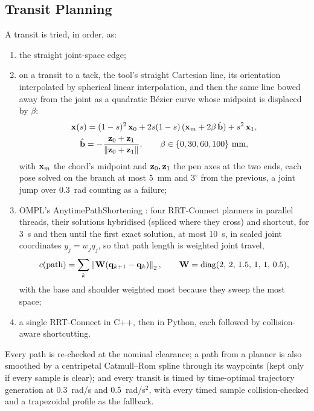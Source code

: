 \subsection{Transit Planning}
\label{sec:mc_transit}
A transit is tried, in order, as:
\begin{enumerate}
\item the straight joint-space edge;
\item on a transit to a tack, the tool's straight Cartesian line, its orientation interpolated by
  spherical linear interpolation, and then the same line bowed away from the joint as a quadratic
  B\'ezier curve whose midpoint is displaced by $\beta$:
  \begin{equation}
  \begin{gathered}
  \mathbf{x}(s) = (1-s)^2\,\mathbf{x}_0 + 2s(1-s)\,(\mathbf{x}_m + 2\beta\,\hat{\mathbf{b}}) + s^2\,\mathbf{x}_1,\\
  \hat{\mathbf{b}}=-\frac{\mathbf{z}_0+\mathbf{z}_1}{\left\lVert\mathbf{z}_0+\mathbf{z}_1\right\rVert},\qquad
  \beta\in\{0, 30, 60, 100\}\ \mathrm{mm},
  \end{gathered}
  \label{eq:cartesian_bow}
  \end{equation}
  with $\mathbf{x}_m$ the chord's midpoint and $\mathbf{z}_0,\mathbf{z}_1$ the pen axes at the two ends, each
  pose solved on the branch at most 5~mm and $3^\circ$ from the previous, a joint jump over 0.3~rad
  counting as a failure;
\item OMPL's AnytimePathShortening \cite{luna2013aps,sucan2012ompl}: four RRT-Connect planners
  \cite{kuffner2000rrtconnect} in parallel threads, their solutions hybridised (spliced where they
  cross) and shortcut, for 3~s and then until the first exact solution, at most 10~s, in scaled joint
  coordinates $y_j=w_jq_j$, so that path length is weighted joint travel,
  \begin{equation}
  c(\text{path}) = \sum_{k}\left\lVert\mathbf{W}(\mathbf{q}_{k+1}-\mathbf{q}_k)\right\rVert_2,\qquad
  \mathbf{W}=\operatorname{diag}(2,\,2,\,1.5,\,1,\,1,\,0.5),
  \label{eq:transit_cost}
  \end{equation}
  with the base and shoulder weighted most because they sweep the most space;
\item a single RRT-Connect in C++, then in Python, each followed by collision-aware shortcutting.
\end{enumerate}
Every path is re-checked at the nominal clearance; a path from a planner is also smoothed by a
centripetal Catmull--Rom spline through its waypoints (kept only if every sample is clear); and every
transit is timed by time-optimal trajectory generation \cite{kunz2012totg} at 0.3~rad/s and
0.5~rad/s$^2$, with every timed sample collision-checked and a trapezoidal profile as the fallback.

